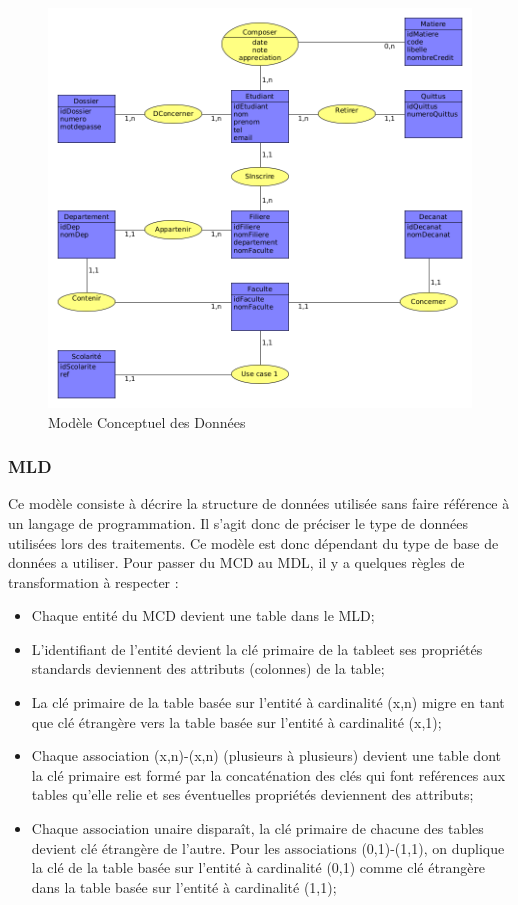 \documentclass[12pt,a4paper]{article}
\begin{document}
	\begin{figure}[H]
		\centering
		\includegraphics[width=\textwidth]{./images/mcd}
		\caption{Modèle Conceptuel des Données}
		\label{fig:figure6}
	\end{figure}

	\subsubsection{MLD}
	Ce modèle consiste à décrire la structure de données utilisée sans faire référence à un langage de programmation. Il s'agit donc de préciser le type de données utilisées lors des traitements. Ce modèle est donc dépendant du type de base de données a utiliser.
	Pour passer du MCD au MDL, il y a quelques règles de transformation à respecter :
	\begin{itemize}
		\item Chaque entité du MCD devient une table dans le MLD;
		\item L'identifiant de l'entité devient la clé primaire de la tableet ses propriétés standards deviennent des attributs (colonnes) de la table;
		\item La clé primaire de la table basée sur l'entité à cardinalité (x,n) migre en tant que clé étrangère vers la table basée sur l'entité à cardinalité (x,1);
		\item Chaque association (x,n)-(x,n) (plusieurs à plusieurs) devient une table dont la clé primaire est formé par la concaténation des clés qui font reférences aux tables qu'elle relie et ses éventuelles propriétés deviennent des attributs;
		\item Chaque association unaire disparaît, la clé primaire de chacune des tables devient clé étrangère de l'autre. Pour les associations (0,1)-(1,1), on duplique la clé de la table basée sur l'entité à cardinalité (0,1) comme clé étrangère dans la table basée sur l'entité à cardinalité (1,1);
	\end{itemize}
\end{document}
